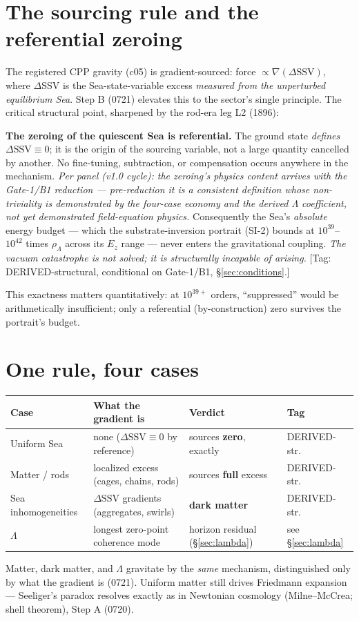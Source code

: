 \documentclass[11pt]{article}
\newcommand{\dssv}{\Delta\mathrm{SSV}}
\newcommand{\rL}{\rho_\Lambda}
\begin{document}
\section{The sourcing rule and the referential zeroing}
\label{sec:rule}
The registered CPP gravity (c05) is gradient-sourced: force $\propto \nabla(\dssv)$, where $\dssv$
is the Sea-state-variable excess \emph{measured from the unperturbed equilibrium Sea}. Step B (0721)
elevates this to the sector's single principle. The critical structural point, sharpened by the
rod-era leg L2 (1896):
\begin{mdframed}[linewidth=1pt,linecolor=black]
\textbf{The zeroing of the quiescent Sea is referential.} The ground state \emph{defines}
$\dssv \equiv 0$; it is the origin of the sourcing variable, not a large quantity cancelled by
another. No fine-tuning, subtraction, or compensation occurs anywhere in the mechanism. \emph{Per panel (v1.0 cycle): the zeroing's physics content arrives with the Gate-1/B1 reduction --- pre-reduction it is a consistent definition whose non-triviality is demonstrated by the four-case economy and the derived $\Lambda$ coefficient, not yet demonstrated field-equation physics.}
Consequently the Sea's \emph{absolute} energy budget --- which the substrate-inversion portrait
(SI-2) bounds at $10^{39}$--$10^{42}$ times $\rL$ across its $E_z$ range --- never enters the
gravitational coupling. \emph{The vacuum catastrophe is not solved; it is structurally incapable of
arising.} [Tag: DERIVED-structural, conditional on Gate-1/B1, \S\ref{sec:conditions}.]
\end{mdframed}
This exactness matters quantitatively: at $10^{39+}$ orders, ``suppressed'' would be arithmetically
insufficient; only a referential (by-construction) zero survives the portrait's budget.

\section{One rule, four cases}
\label{sec:cases}
\begin{center}\begin{tabular}{@{}llll@{}}
\toprule
Case & What the gradient is & Verdict & Tag \\
\midrule
Uniform Sea & none ($\dssv \equiv 0$ by reference) & sources \textbf{zero}, exactly & DERIVED-str.\\
Matter / rods & localized excess (cages, chains, rods) & sources \textbf{full} excess & DERIVED-str.\\
Sea inhomogeneities & $\dssv$ gradients (aggregates, swirls) & \textbf{dark matter} & DERIVED-str.\\
$\Lambda$ & longest zero-point coherence mode & horizon residual (\S\ref{sec:lambda}) & see \S\ref{sec:lambda}\\
\bottomrule
\end{tabular}\end{center}
Matter, dark matter, and $\Lambda$ gravitate by the \emph{same} mechanism, distinguished only by what
the gradient is (0721). Uniform matter still drives Friedmann expansion --- Seeliger's paradox
resolves exactly as in Newtonian cosmology (Milne--McCrea; shell theorem), Step A (0720).
\end{document}
